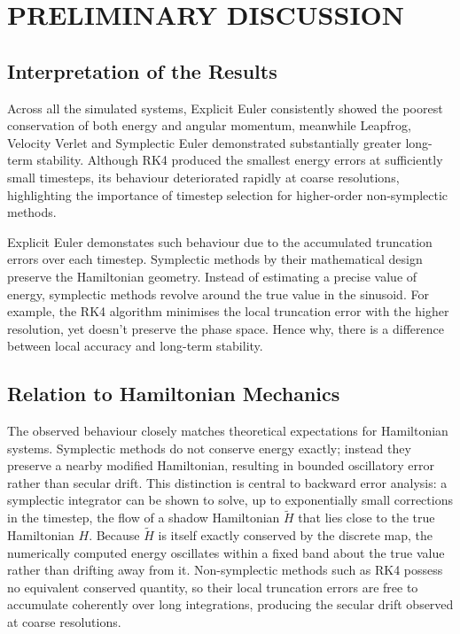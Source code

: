 \section{PRELIMINARY DISCUSSION}

\subsection{Interpretation of the Results}

Across all the simulated systems, Explicit Euler consistently showed the poorest conservation of both energy and
angular momentum, meanwhile Leapfrog, Velocity Verlet and Symplectic Euler demonstrated substantially greater
long-term stability.
Although RK4 produced the smallest energy errors at sufficiently small timesteps, its behaviour deteriorated
rapidly at coarse resolutions, highlighting the importance of timestep selection for higher-order
non-symplectic methods.

Explicit Euler demonstates such behaviour due to the accumulated truncation errors over each timestep.
Symplectic methods by their mathematical design preserve the Hamiltonian geometry.
Instead of estimating a precise value of energy, symplectic methods revolve around the true value in the sinusoid.
For example, the RK4 algorithm minimises the local truncation error with the higher resolution, yet doesn't preserve
the phase space.
Hence why, there is a difference between local accuracy and long-term stability.

\subsection{Relation to Hamiltonian Mechanics}

The observed behaviour closely matches theoretical expectations for Hamiltonian systems.
Symplectic methods do not conserve energy exactly; instead they preserve a nearby modified Hamiltonian,
resulting in bounded oscillatory error rather than secular drift.
This distinction is central to backward error analysis: a symplectic integrator can be shown to solve, up
to exponentially small corrections in the timestep, the flow of a shadow Hamiltonian $\tilde{H}$ that lies close
to the true Hamiltonian $H$. Because $\tilde{H}$ is itself exactly conserved by the discrete map, the numerically
computed energy oscillates within a fixed band about the true value rather than drifting away from it.
Non-symplectic methods such as RK4 possess no equivalent conserved quantity, so their local truncation errors
are free to accumulate coherently over long integrations, producing the secular drift observed at coarse
resolutions.


